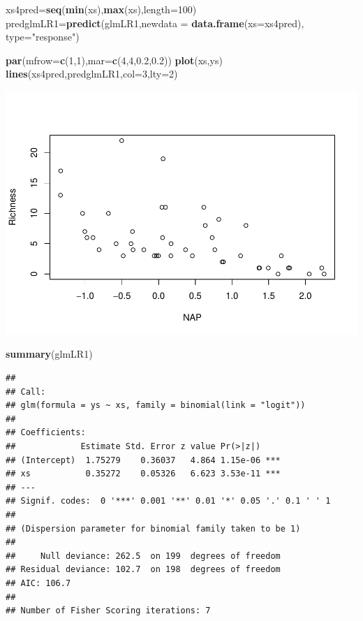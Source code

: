 \documentclass[
]{book}
\newenvironment{Shaded}{\begin{snugshade}}{\end{snugshade}}
\newcommand{\AttributeTok}[1]{\textcolor[rgb]{0.13,0.29,0.53}{#1}}
\newcommand{\DecValTok}[1]{\textcolor[rgb]{0.00,0.00,0.81}{#1}}
\newcommand{\FloatTok}[1]{\textcolor[rgb]{0.00,0.00,0.81}{#1}}
\newcommand{\FunctionTok}[1]{\textcolor[rgb]{0.13,0.29,0.53}{\textbf{#1}}}
\newcommand{\NormalTok}[1]{#1}
\newcommand{\OtherTok}[1]{\textcolor[rgb]{0.56,0.35,0.01}{#1}}
\newcommand{\StringTok}[1]{\textcolor[rgb]{0.31,0.60,0.02}{#1}}
\begin{document}
\begin{Shaded}
\begin{Highlighting}[]
\NormalTok{xs4pred}\OtherTok{=}\FunctionTok{seq}\NormalTok{(}\FunctionTok{min}\NormalTok{(xs),}\FunctionTok{max}\NormalTok{(xs),}\AttributeTok{length=}\DecValTok{100}\NormalTok{)}
\NormalTok{predglmLR1}\OtherTok{=}\FunctionTok{predict}\NormalTok{(glmLR1,}\AttributeTok{newdata =} \FunctionTok{data.frame}\NormalTok{(}\AttributeTok{xs=}\NormalTok{xs4pred),}
\AttributeTok{type=}\StringTok{"response"}\NormalTok{)}

\FunctionTok{par}\NormalTok{(}\AttributeTok{mfrow=}\FunctionTok{c}\NormalTok{(}\DecValTok{1}\NormalTok{,}\DecValTok{1}\NormalTok{),}\AttributeTok{mar=}\FunctionTok{c}\NormalTok{(}\DecValTok{4}\NormalTok{,}\DecValTok{4}\NormalTok{,}\FloatTok{0.2}\NormalTok{,}\FloatTok{0.2}\NormalTok{))}
\FunctionTok{plot}\NormalTok{(xs,ys)}
\FunctionTok{lines}\NormalTok{(xs4pred,predglmLR1,}\AttributeTok{col=}\DecValTok{3}\NormalTok{,}\AttributeTok{lty=}\DecValTok{2}\NormalTok{)}
\end{Highlighting}
\end{Shaded}

\includegraphics{ECOMODbook_files/figure-latex/unnamed-chunk-44-1.pdf}

\begin{Shaded}
\begin{Highlighting}[]
\FunctionTok{summary}\NormalTok{(glmLR1)}
\end{Highlighting}
\end{Shaded}

\begin{verbatim}
## 
## Call:
## glm(formula = ys ~ xs, family = binomial(link = "logit"))
## 
## Coefficients:
##             Estimate Std. Error z value Pr(>|z|)    
## (Intercept)  1.75279    0.36037   4.864 1.15e-06 ***
## xs           0.35272    0.05326   6.623 3.53e-11 ***
## ---
## Signif. codes:  0 '***' 0.001 '**' 0.01 '*' 0.05 '.' 0.1 ' ' 1
## 
## (Dispersion parameter for binomial family taken to be 1)
## 
##     Null deviance: 262.5  on 199  degrees of freedom
## Residual deviance: 102.7  on 198  degrees of freedom
## AIC: 106.7
## 
## Number of Fisher Scoring iterations: 7
\end{verbatim}
\end{document}
